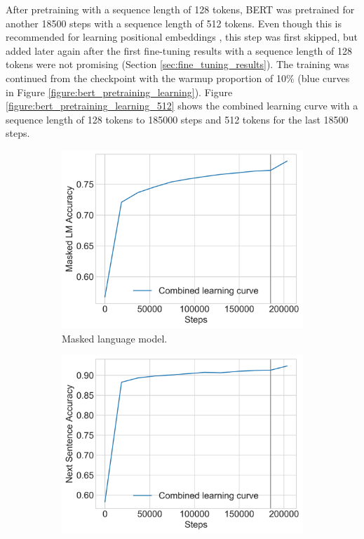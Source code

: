 After pretraining with a sequence length of 128 tokens, \ac{BERT} was pretrained for another 18500 steps with a sequence length of 512 tokens.
Even though this is recommended for learning positional embeddings \cite[p. 13]{Devlin2018}, this step was first skipped, but added later again after the first fine-tuning results with a sequence length of 128 tokens were not promising (Section \ref{sec:fine_tuning_results}).
The training was continued from the checkpoint with the warmup proportion of 10\% (blue curves in Figure \ref{figure:bert_pretraining_learning}).
Figure \ref{figure:bert_pretraining_learning_512} shows the combined learning curve with a sequence length of 128 tokens to 185000 steps and 512 tokens for the last 18500 steps.
\begin{figure}[h]
    \begin{subfigure}{0.5\textwidth}
        \includegraphics[width=\textwidth]{figures/charts/pretraining_learning_512.png}
        \caption{Masked language model.}
        \label{figure:bert_pretraining_learning_512_mlm}
    \end{subfigure}
    \begin{subfigure}{0.5\textwidth}
        \includegraphics[width=\textwidth]{figures/charts/pretraining_learning_512_nsp.png}

\end{subfigure}
\end{figure}
